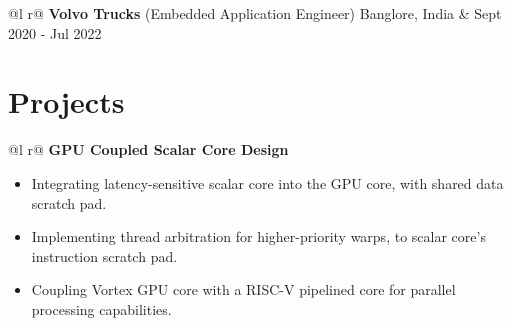 \documentclass[a4paper,10pt]{article}
\begin{document}
\begin{tabularx}{\linewidth}{ @{}l r@{} }
\textbf{Volvo Trucks} (Embedded Application Engineer) Banglore, India & \hfill Sept 2020 - Jul 2022 \\[2.75pt]
\end{tabularx}

\section{Projects}

\begin{tabularx}{\linewidth}{ @{}l r@{} }
\textbf{GPU Coupled Scalar Core Design} \\[2.75pt]
{
\begin{minipage}[t]{\linewidth}
    \begin{itemize}[nosep,after=\strut, leftmargin=2em, itemsep=3pt]
        \item Integrating latency-sensitive scalar core into the GPU core, with shared data scratch pad. 
        \item Implementing thread arbitration for higher-priority warps, to scalar core's instruction scratch pad.
        \item Coupling Vortex GPU core with a RISC-V pipelined core for parallel processing capabilities. 
    \end{itemize}
    \end{minipage}
} 
\end{tabularx}
\end{document}
